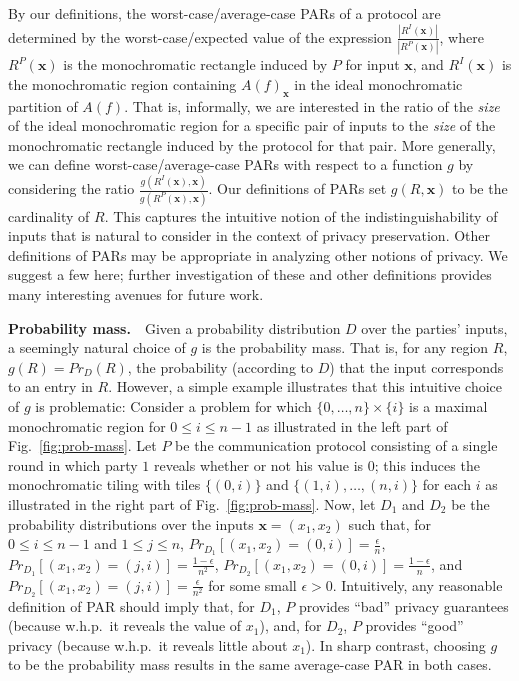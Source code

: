 \documentclass{article}
\theoremstyle{theorem}
\theoremstyle{definition}
\theoremstyle{remark}
\begin{document}
By our definitions, the worst-case/average-case PARs of a protocol
are determined by the worst-case/expected value of the expression
$\frac{|R^I(\mathbf{x})|}{|R^P(\mathbf{x})|}$, where $R^P(\mathbf{x})$ is the
monochromatic rectangle induced by $P$ for input $\mathbf{x}$, and
$R^I(\mathbf{x})$ is the monochromatic region containing
$A(f)_{\mathbf{x}}$ in the ideal monochromatic partition of $A(f)$.
That is, informally, we are interested in the ratio of the
\emph{size} of the ideal monochromatic region for a specific pair of inputs to the \emph{size} of the monochromatic rectangle induced by the protocol for that pair. More generally, we can define worst-case/average-case PARs with respect to a function $g$ by considering the ratio
$\frac{g(R^I(\mathbf{x}),\mathbf{x})}{g(R^P(\mathbf{x}),\mathbf{x})}$.  Our definitions of PARs set $g(R,\mathbf{x})$ to be the cardinality of $R$.  This captures the intuitive notion of the
indistinguishability of inputs that is natural to consider in the
context of privacy preservation. Other definitions of PARs may be
appropriate in analyzing other notions of privacy.  We suggest a few here; further
investigation of these and other definitions provides many interesting avenues for future work.


\textbf{Probability mass.}\ \ Given a probability distribution $D$ over the parties' inputs, a
seemingly natural choice of $g$ is the probability mass. That is,
for any region $R$, $g(R)=Pr_D(R)$, the probability (according to
$D$) that the input corresponds to an entry in $R$. However, a 
simple example illustrates that this intuitive choice of
$g$ is problematic: Consider a problem for which $\{0,\ldots,n\}\times\{i\}$
is a maximal monochromatic region for $0\leq i\leq n-1$ as illustrated in the left part of Fig.~\ref{fig:prob-mass}.  Let $P$ be the communication protocol consisting
of a single round in which party $1$ reveals whether or not his value is $0$;
this induces the monochromatic tiling with tiles $\{(0,i)\}$ and $\{(1,i),\ldots,(n,i)\}$ for each $i$ as illustrated in the right part of Fig.~\ref{fig:prob-mass}.  Now, let $D_1$ and $D_2$ be the probability distributions over the inputs $\mathbf{x}=(x_1,x_2)$ such that, for $0\leq i\leq n-1$ and $1\leq j\leq n$, $Pr_{D_1}[(x_1,x_2)=(0,i)]=\frac{\epsilon}{n}$, $Pr_{D_1}[(x_1,x_2)=(j,i)]=\frac{1-\epsilon}{n^2}$, $Pr_{D_2}[(x_1,x_2)=(0,i)]=\frac{1-\epsilon}{n}$, and $Pr_{D_2}[(x_1,x_2)=(j,i)]=\frac{\epsilon}{n^2}$ for some small $\epsilon>0$.  
Intuitively, any
reasonable definition of PAR should imply that, for $D_1$, $P$
provides ``bad'' privacy guarantees (because w.h.p.~it reveals the 
value of $x_1$), 
and, for $D_2$, $P$ provides ``good''
privacy (because w.h.p.~it reveals little 
about $x_1$). 
In sharp contrast, choosing $g$ to be the probability mass results
in the same average-case PAR in both cases.
\end{document}
